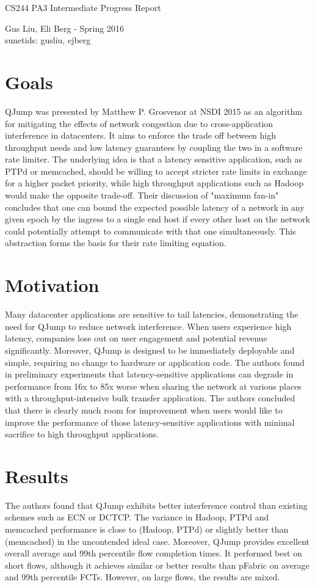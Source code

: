 \documentclass[12pt]{article}
\begin{document}
\begin{center}
{\Large CS244 PA3 Intermediate Progress Report}
\begin{center}
Gus Liu, Eli Berg - Spring 2016 \\
sunetids: gusliu, ejberg
\end{center} 
\end{center}

\section*{Goals}	
	QJump was presented by Matthew P. Grosvenor at NSDI 2015 as an algorithm for mitigating the effects of network congestion due to cross-application interference in datacenters. It aims to enforce the trade off between high throughput needs and low latency guarantees by coupling the two in a software rate limiter. The underlying idea is that a latency sensitive application, such as PTPd or memcached, should be willing to accept stricter rate limits in exchange for a higher packet priority, while high throughput applications such as Hadoop would make the opposite trade-off. Their discussion of "maximum fan-in" concludes that one can bound the expected possible latency of a network in any given epoch by the ingress to a single end host if every other host on the network could potentially attempt to communicate with that one simultaneously. This abstraction forms the basis for their rate limiting equation.

\section*{Motivation}
	Many datacenter applications are sensitive to tail latencies, demonstrating the need for QJump to reduce network interference. When users experience high latency, companies lose out on user engagement and potential revenue significantly. Moreover, QJump is designed to be immediately deployable and simple, requiring no change to hardware or application code. The authors found in preliminary experiments that latency-sensitive applications can degrade in performance from 16x to 85x worse when sharing the network at various places with a throughput-intensive bulk transfer application. The authors concluded that there is clearly much room for improvement when users would like to improve the performance of those latency-sensitive applications with minimal sacrifice to high throughput applications.
	
\section*{Results}
	The authors found that QJump exhibits better interference control than existing schemes such as ECN or DCTCP. The variance in Hadoop, PTPd and memcached performance is close to (Hadoop, PTPd) or slightly better than (memcached) in the uncontended ideal case. Moreover, QJump provides excellent overall average and 99th percentile flow completion times. It performed best on short flows, although it achieves similar or better results than pFabric on average and 99th percentile FCTs. However, on large flows, the results are mixed. 
	
\end{document}
